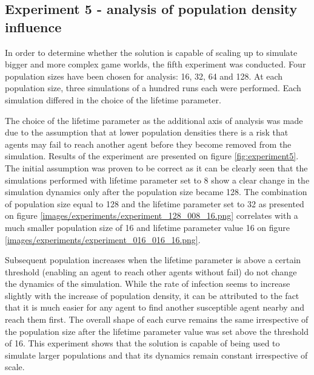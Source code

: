 \subsection{Experiment 5 - analysis of population density influence}

In order to determine whether the solution is capable of scaling up to simulate bigger and more complex game worlds, the fifth experiment was conducted.
Four population sizes have been chosen for analysis: 16, 32, 64 and 128.
At each population size, three simulations of a hundred runs each were performed.
Each simulation differed in the choice of the lifetime parameter.

The choice of the lifetime parameter as the additional axis of analysis was made due to the assumption that at lower population densities there is a risk that agents may fail to reach another agent before they become removed from the simulation.
Results of the experiment are presented on figure \ref{fig:experiment5}.
The initial assumption was proven to be correct as it can be clearly seen that the simulations performed with lifetime parameter set to 8 show a clear change in the simulation dynamics only after the population size became 128.
The combination of population size equal to 128 and the lifetime parameter set to 32 as presented on figure \ref{images/experiments/experiment_128_008_16.png} correlates with a much smaller population size of 16 and lifetime parameter value 16 on figure \ref{images/experiments/experiment_016_016_16.png}.

Subsequent population increases when the lifetime parameter is above a certain threshold (enabling an agent to reach other agents without fail) do not change the dynamics of the simulation.
While the rate of infection seems to increase slightly with the increase of population density, it can be attributed to the fact that it is much easier for any agent to find another susceptible agent nearby and reach them first.
The overall shape of each curve remains the same irrespective of the population size after the lifetime parameter value was set above the threshold of 16.
This experiment shows that the solution is capable of being used to simulate larger populations and that its dynamics remain constant irrespective of scale.


